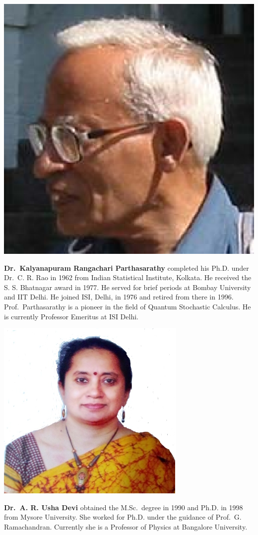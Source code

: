 \centerline{\includegraphics[scale=0.6]{authorsphotos/Prof_K_R_Parthasarathy_1.eps}}
\bigskip

\noindent
\textbf{Dr.\ Kalyanapuram Rangachari Parthasarathy} completed his Ph.D. under Dr.\ C. R. Rao in 1962 from Indian Statistical Institute, Kolkata. He received the S. S. Bhatnagar award in 1977. He served for brief periods at Bombay University and IIT Delhi. He joined ISI, Delhi, in 1976 and retired from there in 1996. Prof.\ Parthasarathy is a pioneer in the field of Quantum Stochastic Calculus. He is currently Professor Emeritus at ISI Delhi.
\vskip 1.5cm

\centerline{\includegraphics[scale=1.1]{authorsphotos/Prof_A_R_Usha_Devi.eps}}
\bigskip

\noindent
\textbf{Dr.\ A. R. Usha Devi} obtained the M.Sc.\ degree in 1990 and Ph.D. in 1998 from Mysore University. She worked for Ph.D. under the guidance of Prof.\ G. Ramachandran. Currently she is a Professor of Physics at Bangalore University.
